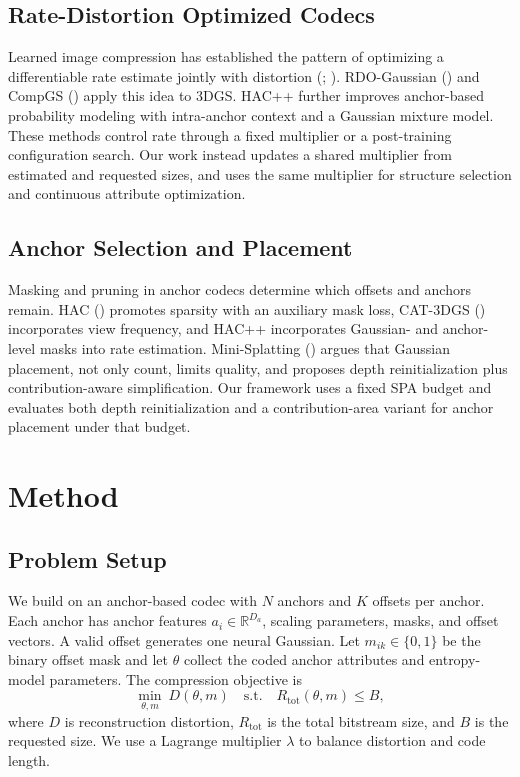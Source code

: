 \documentclass{article}
\begin{document}
\subsection{Rate-Distortion Optimized Codecs}
Learned image compression has established the pattern of optimizing a differentiable rate estimate jointly with distortion (\citet{balle2018}; \citet{cheng2020}). RDO-Gaussian (\citet{wang2024a}) and CompGS (\citet{liu2024b}) apply this idea to 3DGS. HAC++ further improves anchor-based probability modeling with intra-anchor context and a Gaussian mixture model. These methods control rate through a fixed multiplier or a post-training configuration search. Our work instead updates a shared multiplier from estimated and requested sizes, and uses the same multiplier for structure selection and continuous attribute optimization.

\subsection{Anchor Selection and Placement}
Masking and pruning in anchor codecs determine which offsets and anchors remain. HAC (\citet{chen2024}) promotes sparsity with an auxiliary mask loss, CAT-3DGS (\citet{zhan2025}) incorporates view frequency, and HAC++ incorporates Gaussian- and anchor-level masks into rate estimation. Mini-Splatting (\citet{fang2024}) argues that Gaussian placement, not only count, limits quality, and proposes depth reinitialization plus contribution-aware simplification. Our framework uses a fixed SPA budget and evaluates both depth reinitialization and a contribution-area variant for anchor placement under that budget.

\section{Method}

\subsection{Problem Setup}
We build on an anchor-based codec with $N$ anchors and $K$ offsets per anchor. Each anchor has anchor features $a_i \in \mathbb{R}^{D_a}$, scaling parameters, masks, and offset vectors. A valid offset generates one neural Gaussian. Let $m_{ik}\in\{0,1\}$ be the binary offset mask and let $\theta$ collect the coded anchor attributes and entropy-model parameters. The compression objective is
\begin{equation}
\min_{\theta,m}\ D(\theta,m)\quad \mathrm{s.t.}\quad R_{\mathrm{tot}}(\theta,m)\le B,
\end{equation}
where $D$ is reconstruction distortion, $R_{\mathrm{tot}}$ is the total bitstream size, and $B$ is the requested size. We use a Lagrange multiplier $\lambda$ to balance distortion and code length.
\end{document}
